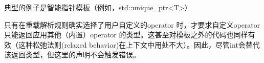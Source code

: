 \begin{notice}
典型的例子是智能指针模板（例如，std::unique\_ptr<T>）
\end{notice}

只有在重载解析规则确实选择了用户自定义的operator\inlcpp{->} 时，才要求自定义operator\inlcpp{->} 只能返回应用其他（内置）operator\inlcpp{->} 的类型。这甚至对模板之外的代码也同样有效（这种松弛法则(relaxed behavior)在上下文中用处不大）。因此，尽管int会替代该返回类型，但这里的声明不会触发错误。






































